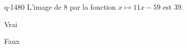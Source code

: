 \begin{truefalse}{q-1480}
L'image de $8$ par la fonction $x\mapsto 11x-59$ est $39$.
\item Vrai
\item* Faux
\end{truefalse}

